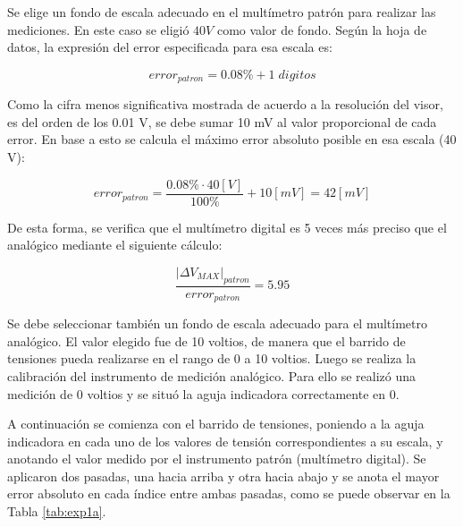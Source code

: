 Se elige un fondo de escala adecuado en el multímetro patrón para realizar las mediciones. En este caso se eligió $40V$ como valor de fondo.
\clearpage
Según la hoja de datos, la expresión del error especificada para esa escala es:

\begin{equation}\label{eq::errorPatron}
    error_{patron} = 0.08\% + 1\; digitos
\end{equation}

Como la cifra menos significativa mostrada de acuerdo a la resolución del visor, es del orden de los 0.01 V, se debe sumar 10 mV al valor proporcional de cada error. En base a esto se calcula el máximo error absoluto posible en esa escala (40 V):

\begin{equation}
    error_{patron} = \frac{0.08\% \cdot 40 [V]}{100\%} + 10 [mV] = 42 [mV]
\end{equation}

De esta forma, se verifica que el multímetro digital es 5 veces más preciso que el analógico mediante el siguiente cálculo:

\begin{equation}
    \frac{|\Delta V_{MAX}|_{patron}}{error_{patron}} = 5.95
\end{equation}


Se debe seleccionar también un fondo de escala adecuado para el multímetro analógico. El valor elegido fue de 10 voltios, de manera que el barrido de tensiones pueda realizarse en el rango de 0 a 10 voltios. Luego se realiza la calibración del instrumento de medición analógico. Para ello se realizó una medición de 0 voltios y se situó la aguja indicadora correctamente en 0.

A continuación se comienza con el barrido de tensiones, poniendo a la aguja indicadora en cada uno de los valores de tensión correspondientes a su escala, y anotando el valor medido por el instrumento patrón (multímetro digital). Se aplicaron dos pasadas, una hacia arriba y otra hacia abajo y se anota el mayor error absoluto en cada índice entre ambas pasadas, como se puede observar en la Tabla \ref{tab:exp1a}.


